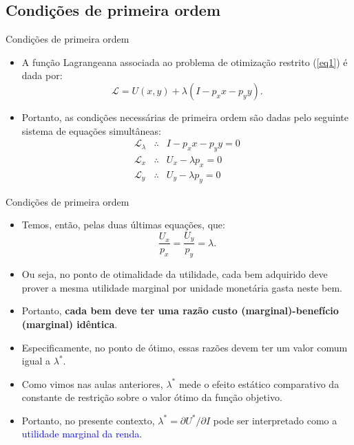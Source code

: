 \documentclass[10pt]{beamer}
\begin{document}
        \subsection{Condições de primeira ordem}
        \begin{frame}{Condições de primeira ordem}
            \begin{itemize}
                \item A função Lagrangeana associada ao problema de otimização restrito (\ref{eq1}) é dada por:
                \[
                \mathcal{L} = U(x,y) + \lambda(I - p_xx - p_yy).
                \]
                \bigskip
                \item Portanto, as condições necessárias de primeira ordem são dadas pelo seguinte sistema de equações simultâneas:
                \begin{eqnarray}
                            \mathcal{L}_\lambda &\therefore& I - p_xx - p_yy = 0 \nonumber \\
                            \mathcal{L}_x &\therefore& U_x - \lambda p_x = 0 \nonumber \\
                            \mathcal{L}_y &\therefore& U_y - \lambda p_y = 0 \nonumber
                \end{eqnarray}
            \end{itemize}
        \end{frame}
        
        \begin{frame}{Condições de primeira ordem}
            \begin{itemize}
                \item Temos, então, pelas duas últimas equações, que:
                \[
                \frac{U_x}{p_x} = \frac{U_y}{p_y} = \lambda.
                \]
                \bigskip
                \item Ou seja, no ponto de otimalidade da utilidade, cada bem adquirido deve prover a mesma utilidade marginal por unidade monetária gasta neste bem.
                \bigskip
                \item Portanto, \textbf{cada bem deve ter uma razão custo (marginal)-benefício (marginal) idêntica}.
                \bigskip
                \item Especificamente, no ponto de ótimo, essas razões devem ter um valor comum igual a $\lambda^*$.
                \bigskip
                \item Como vimos nas aulas anteriores, $\lambda^*$ mede o efeito estático comparativo da constante de restrição sobre o valor ótimo da função objetivo.
                \bigskip
                \item Portanto, no presente contexto, $\lambda^* = \partial U^*/\partial I$ pode ser interpretado como a \textcolor{blue}{utilidade marginal da renda}.
            \end{itemize}
        \end{frame}
        
\end{document}
